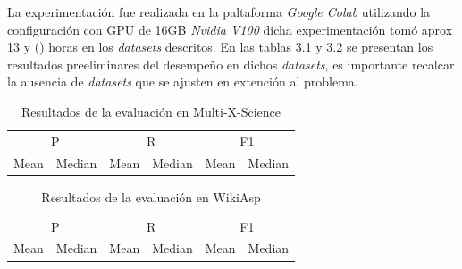 La experimentación fue realizada en la paltaforma \emph{Google Colab} utilizando la configuración con GPU de 16GB \emph{Nvidia V100} dicha experimentación tomó aprox 13 y () horas en los \emph{datasets} descritos. En las tablas 3.1 y 3.2 se presentan los resultados preeliminares del desempeño en dichos \emph{datasets}, es importante recalcar la ausencia de \emph{datasets} que se ajusten en extención al problema.

\begin{table}[htb]
    \centering
    \label{tab:example}
    \begin{tabular}{*6c}
      \toprule
      \multicolumn{2}{c}{P}  & \multicolumn{2}{c}{R} & \multicolumn{2}{c}{F1} \\ \cmidrule(r){1-2} \cmidrule(r){3-4} \cmidrule(l){5-6}
      Mean & Median  &  Mean & Median &     Mean & Median   \\
                                                      
      \bottomrule
    \end{tabular}
    \caption{Resultados de la evaluación en Multi-X-Science}

  \end{table}

  \begin{table}[htb]
    \centering
    \label{tab:example}
    \begin{tabular}{*6c}
      \toprule
      \multicolumn{2}{c}{P}  & \multicolumn{2}{c}{R} & \multicolumn{2}{c}{F1} \\ \cmidrule(r){1-2} \cmidrule(r){3-4} \cmidrule(l){5-6}
      Mean & Median  &  Mean & Median &     Mean & Median   \\
                                                      
      \bottomrule
    \end{tabular}
    \caption{Resultados de la evaluación en WikiAsp}

  \end{table}
